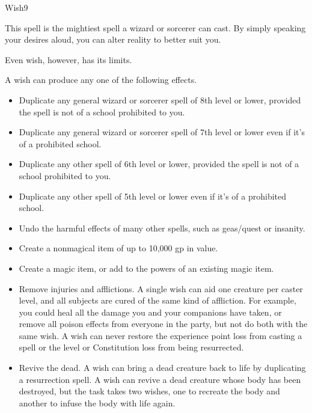 \begin{spellsection}{Wish}{9}
\begin{spellheader}
\end{spellheader}
\begin{spelltargetinginfo}
\end{spelltargetinginfo}
\begin{spellcontent}
    \spelleffect This spell is the mightiest spell a wizard or sorcerer can cast. By simply speaking your desires aloud, you can alter reality to better suit you.
    \par Even wish, however, has its limits.
    \par A wish can produce any one of the following effects.
    \begin{itemize}
        \item Duplicate any general wizard or sorcerer spell of 8th level or lower, provided the spell is not of a school prohibited to you.
        \item Duplicate any general wizard or sorcerer spell of 7th level or lower even if it's of a prohibited school.
        \item Duplicate any other spell of 6th level or lower, provided the spell is not of a school prohibited to you.
        \item Duplicate any other spell of 5th level or lower even if it's of a prohibited school. 
        \item Undo the harmful effects of many other spells, such as geas/quest or insanity.
        \item Create a nonmagical item of up to 10,000 gp in value.
        \item Create a magic item, or add to the powers of an existing magic item.
        \item Remove injuries and afflictions. A single wish can aid one creature per caster level, and all subjects are cured of the same kind of affliction. For example, you could heal all the damage you and your companions have taken, or remove all poison effects from everyone in the party, but not do both with the same wish. A wish can never restore the experience point loss from casting a spell or the level or Constitution loss from being resurrected.
        \item Revive the dead. A wish can bring a dead creature back to life by duplicating a resurrection spell. A wish can revive a dead creature whose body has been destroyed, but the task takes two wishes, one to recreate the body and another to infuse the body with life again.

\end{itemize}
\end{spellcontent}
\end{spellsection}
